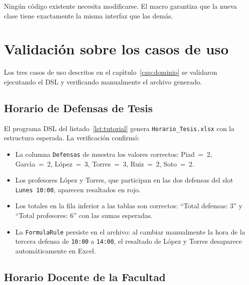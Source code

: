 Ning\'un c\'odigo existente necesita modificarse.  El macro 
garantiza que la nueva clase tiene exactamente la misma interfaz que las dem\'as.

\section{Validaci\'on sobre los casos de uso}
\label{sec:validacion}

Los tres casos de uso descritos en el cap\'{\i}tulo~\ref{cap:dominio} se
validaron ejecutando el DSL y verificando manualmente el archivo
\xlsx{} generado.

\subsection{Horario de Defensas de Tesis}
\label{ssec:val-defensas}

El programa DSL del listado~\ref{lst:tutorial} genera \texttt{Horario\_Tesis.xlsx}
con la estructura esperada.  La verificaci\'on confirm\'o:

\begin{itemize}
  \item La columna \texttt{Defensas} de  muestra los
    valores correctos: Piad~=~2, Garc\'{\i}a~=~2, L\'opez~=~3, Torres~=~3,
    Ruiz~=~2, Soto~=~2.
  \item Los profesores L\'opez y Torres, que participan en las dos defensas
    del slot \texttt{Lunes~10:00}, aparecen resaltados en rojo.
  \item Los totales en la fila inferior a las tablas son correctos:
    ``Total defensas: 3'' y ``Total profesores: 6'' con las sumas esperadas.
  \item La \texttt{FormulaRule} persiste en el archivo: al cambiar
    manualmente la hora de la tercera defensa de \texttt{10:00} a
    \texttt{14:00}, el resaltado de L\'opez y Torres desaparece
    autom\'aticamente en Excel.
\end{itemize}

\subsection{Horario Docente de la Facultad}
\label{ssec:val-facultad}

